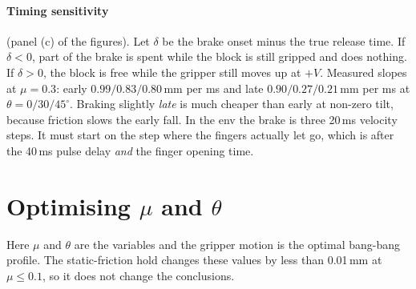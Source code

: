 \documentclass[11pt,a4paper]{article}
\begin{document}
\paragraph{Timing sensitivity} (panel (c) of the figures). Let $\delta$ be the brake onset minus the true release time.
If $\delta<0$, part of the brake is spent while the block is still gripped and does nothing. If $\delta>0$, the block is
free while the gripper still moves up at $+V$. Measured slopes at $\mu=0.3$:
early $0.99/0.83/0.80$\,mm per ms and late $0.90/0.27/0.21$\,mm per ms at $\theta=0/30/45^\circ$.
Braking slightly \emph{late} is much cheaper than early at non-zero tilt, because friction slows the early fall.
In the env the brake is three 20\,ms velocity steps. It must start on the step where the fingers actually let go,
which is after the 40\,ms pulse delay \emph{and} the finger opening time.

\section{Optimising $\mu$ and $\theta$}\label{sec:opt}
Here $\mu$ and $\theta$ are the variables and the gripper motion is the optimal bang-bang profile. The static-friction
hold changes these values by less than 0.01\,mm at $\mu\le0.1$, so it does not change the conclusions.
\end{document}
